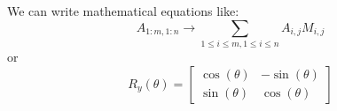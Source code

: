 We can write mathematical equations like:
\begin{equation}
    A_{1:m, 1:n} \rightarrow \sum_{1\leq i\leq m, 1\leq i\leq n}  A_{i, j} M_{i, j} \label{eq:2}
\end{equation}
or
\begin{equation}
    R_{y}(\theta) = \begin{bmatrix}
 \cos(\theta) & -\sin(\theta)\\ 
 \sin(\theta) &  \cos(\theta) 
\end{bmatrix} 
\label{eq:5}
\end{equation}
